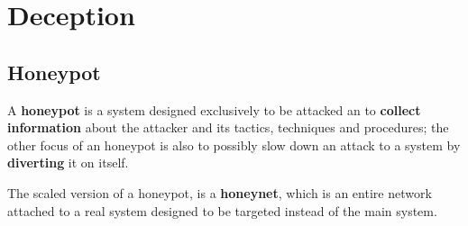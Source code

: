 \chapter{Deception}
\section{Honeypot}
A \textbf{honeypot} is a system designed exclusively to be attacked an to \textbf{collect information} about the attacker and its tactics, techniques and procedures;
the other focus of an honeypot is also to possibly slow down an attack to a system by \textbf{diverting} it on itself.

The scaled version of a honeypot, is a \textbf{honeynet},
which is an entire network attached to a real system designed to be targeted instead of the main system.

